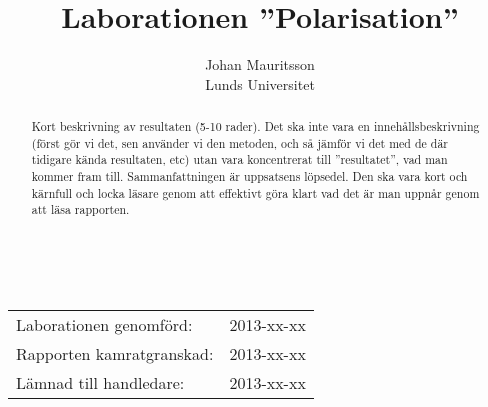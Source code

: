 \documentclass[a4paper]{article}
\title{Laborationen ”Polarisation”}
\author{Johan Mauritsson\\Lunds Universitet}
\makeatletter
\renewcommand*\maketitle{
  {
    \begin{center}
      {\huge\bfseries \@title}\\
      \vspace{5mm}
      {\large \@author}
    \end{center}
    \vspace{2mm}
  }
}
\makeatother
\begin{document}
\maketitle


\begin{abstract}
  Kort beskrivning  av resultaten (5-10  rader). Det ska inte  vara en
  innehållsbeskrivning (först gör vi det, sen använder vi den metoden,
  och så jämför vi det med de där tidigare kända resultaten, etc) utan
  vara   koncentrerat  till   ”resultatet”,   vad   man  kommer   fram
  till. Sammanfattningen är uppsatsens löpsedel. Den ska vara kort och
  kärnfull och locka läsare genom att  effektivt göra klart vad det är
  man uppnår genom att läsa rapporten.
\end{abstract}

\vspace{2mm}

\hspace{-3mm}
\begin{tabular}{ll}
Laborationen genomförd: &	2013-xx-xx \\
Rapporten kamratgranskad: &	2013-xx-xx \\
Lämnad till handledare: &	2013-xx-xx \\
\end{tabular}

\vspace{3mm}
\end{document}
